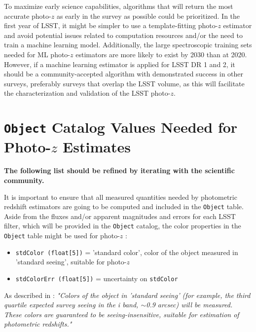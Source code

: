 \documentclass[DM,lsstdraft,toc]{lsstdoc}
\begin{document}
To maximize early science capabilities, algorithms that will return the most accurate photo-$z$ as early in the survey as possible could be prioritized.
In the first year of LSST, it might be simpler to use a template-fitting photo-$z$ estimator and avoid potential issues related to computation resources and/or the need to train a machine learning model.
Additionally, the large spectroscopic training sets needed for ML photo-$z$ estimators are more likely to exist by 2030 than at 2020.
However, if a machine learning estimator is applied for LSST DR 1 and 2, it should be a community-accepted algorithm with demonstrated success in other surveys, preferably surveys that overlap the LSST volume, as this will facilitate the characterization and validation of the LSST photo-$z$.





\clearpage
\section{{\tt Object} Catalog Values Needed for Photo-$z$ Estimates}\label{sec:objvals}

{\bf The following list should be refined by iterating with the scientific community.}

It is important to ensure that all measured quantities needed by photometric redshift estimators are going to be computed and included in the {\tt Object} table. 
Aside from the fluxes and/or apparent magnitudes and errors for each LSST filter, which will be provided in the {\tt Object} catalog, the color properties in the {\tt Object} table might be used for photo-$z$ : 

\begin{itemize}%
\item \texttt{stdColor (float[5])} = 'standard color', color of the object measured in 'standard seeing', suitable for photo-$z$
\item \texttt{stdColorErr (float[5])} = uncertainty on \texttt{stdColor}
\end{itemize}

As described in : {\it "Colors of the object in 'standard seeing' (for example, the third quartile expected survey seeing in the i band, $\sim$0.9 arcsec) will be measured. These colors are guaranteed to be seeing-insensitive, suitable for estimation of photometric redshifts."}
\end{document}
